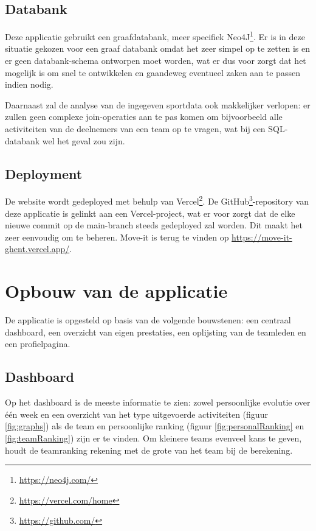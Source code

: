 \subsection{Databank}

Deze applicatie gebruikt een graafdatabank, meer specifiek Neo4J\footnote{\href{https://neo4j.com/}{https://neo4j.com/}}. Er is in deze situatie gekozen voor een graaf databank omdat het zeer simpel op te zetten is en er geen databank-schema ontworpen moet worden, wat er dus voor zorgt dat het mogelijk is om snel te ontwikkelen en gaandeweg eventueel zaken aan te passen indien nodig.

Daarnaast zal de analyse van de ingegeven sportdata ook makkelijker verlopen: er zullen geen complexe join-operaties aan te pas komen om bijvoorbeeld alle activiteiten van de deelnemers van een team op te vragen, wat bij een SQL-databank wel het geval zou zijn.

\subsection{Deployment}

De website wordt gedeployed met behulp van Vercel\footnote{\href{https://vercel.com/home}{https://vercel.com/home}}. De GitHub\footnote{\href{https://github.com/}{https://github.com/}}-repository van deze applicatie is gelinkt aan een Vercel-project, wat er voor zorgt dat de elke nieuwe commit op de main-branch steeds gedeployed zal worden. Dit maakt het zeer eenvoudig om te beheren. Move-it is terug te vinden op \href{https://move-it-ghent.vercel.app/}{https://move-it-ghent.vercel.app/}.

\section{Opbouw van de applicatie}

De applicatie is opgesteld op basis van de volgende bouwstenen: een centraal dashboard, een overzicht van eigen prestaties, een oplijsting van de teamleden en een profielpagina.

\subsection{Dashboard}
Op het dashboard is de meeste informatie te zien: zowel persoonlijke evolutie over één week en een overzicht van het type uitgevoerde activiteiten (figuur \ref{fig:graphs}) als de team en persoonlijke ranking (figuur \ref{fig:personalRanking} en \ref{fig:teamRanking}) zijn er te vinden. Om kleinere teams evenveel kans te geven, houdt de teamranking rekening met de grote van het team bij de berekening.


